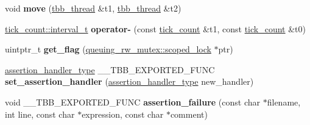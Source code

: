 \begin{DoxyCompactItemize}
\item 
\hypertarget{namespacetbb_ac41903d6b80e61bd6c605412e7820e08}{}void {\bfseries move} (\hyperlink{namespacetbb_a7805ca254302ff88b566f7dcde7e56b0}{tbb\+\_\+thread} \&t1, \hyperlink{namespacetbb_a7805ca254302ff88b566f7dcde7e56b0}{tbb\+\_\+thread} \&t2)\label{namespacetbb_ac41903d6b80e61bd6c605412e7820e08}

\item 
\hypertarget{namespacetbb_aa037c1f149250d61cd2fad4541a5e6cb}{}\hyperlink{classtbb_1_1tick__count_1_1interval__t}{tick\+\_\+count\+::interval\+\_\+t} {\bfseries operator-\/} (const \hyperlink{classtbb_1_1tick__count}{tick\+\_\+count} \&t1, const \hyperlink{classtbb_1_1tick__count}{tick\+\_\+count} \&t0)\label{namespacetbb_aa037c1f149250d61cd2fad4541a5e6cb}

\item 
\hypertarget{namespacetbb_aa2cfd6795ecbcc8ad30310c862f2b001}{}uintptr\+\_\+t {\bfseries get\+\_\+flag} (\hyperlink{classtbb_1_1queuing__rw__mutex_1_1scoped__lock}{queuing\+\_\+rw\+\_\+mutex\+::scoped\+\_\+lock} $\ast$ptr)\label{namespacetbb_aa2cfd6795ecbcc8ad30310c862f2b001}

\item 
\hypertarget{namespacetbb_a4c95ae5d0eb374299c1be4fdb8fb88e3}{}\hyperlink{namespacetbb_acce76b9d59c776788ddbd1588a18af42}{assertion\+\_\+handler\+\_\+type} \+\_\+\+\_\+\+T\+B\+B\+\_\+\+E\+X\+P\+O\+R\+T\+E\+D\+\_\+\+F\+U\+N\+C {\bfseries set\+\_\+assertion\+\_\+handler} (\hyperlink{namespacetbb_acce76b9d59c776788ddbd1588a18af42}{assertion\+\_\+handler\+\_\+type} new\+\_\+handler)\label{namespacetbb_a4c95ae5d0eb374299c1be4fdb8fb88e3}

\item 
\hypertarget{namespacetbb_a9dde30d14920b656e12809567da8f19b}{}void \+\_\+\+\_\+\+T\+B\+B\+\_\+\+E\+X\+P\+O\+R\+T\+E\+D\+\_\+\+F\+U\+N\+C {\bfseries assertion\+\_\+failure} (const char $\ast$filename, int line, const char $\ast$expression, const char $\ast$comment)\label{namespacetbb_a9dde30d14920b656e12809567da8f19b}

\end{DoxyCompactItemize}
